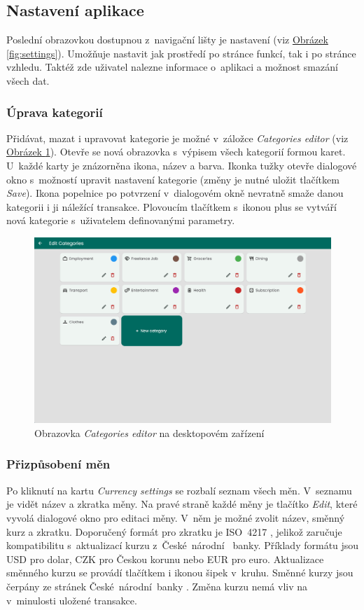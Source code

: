 \documentclass[
  biblatex,
  figures=true,
  tables=false,
  glossaries,
  index
]{kidiplom}
\begin{document}
\subsection{Nastavení aplikace}
Poslední obrazovkou dostupnou z~navigační lišty je nastavení (viz \hyperref[fig:settings]{Obrázek \ref{fig:settings}}). Umožňuje nastavit jak prostředí po stránce funkcí, tak i po stránce vzhledu. Taktéž zde uživatel nalezne informace o~aplikaci a možnost smazání všech dat.

\subsubsection{Úprava kategorií}
Přidávat, mazat i upravovat kategorie je možné v~záložce \textit{Categories editor} (viz \hyperref[fig:categories-editor]{Obrázek \ref{fig:categories-editor}}). Otevře se nová obrazovka s~výpisem všech kategorií formou karet. U~každé karty je znázorněna ikona, název a barva. Ikonka tužky otevře dialogové okno s~možností upravit nastavení kategorie (změny je nutné uložit tlačítkem \textit{Save}). Ikona popelnice po potvrzení v~dialogovém okně nevratně smaže danou kategorii i ji náležící transakce. Plovoucím tlačítkem s~ikonou plus se vytváří nová kategorie s~uživatelem definovanými parametry.

\begin{figure}
  \centering
  \includegraphics[width=\textwidth]{images/categories-editor-large.png}
  \caption{Obrazovka \textit{Categories editor} na desktopovém zařízení}
  \label{fig:categories-editor}
\end{figure}

\subsubsection{Přizpůsobení měn}
Po kliknutí na kartu \textit{Currency settings} se rozbalí seznam všech měn. V~seznamu je vidět název a zkratka měny. Na pravé straně každé měny je tlačítko \textit{Edit}, které vyvolá dialogové okno pro editaci měny. V~něm je možné zvolit název, směnný kurz a zkratku. Doporučený formát pro zkratku je  ISO~4217 \cite{iso4217}, jelikož zaručuje kompatibilitu s~aktualizací kurzu z~České~národní ~banky. Příklady formátu jsou USD pro dolar, CZK pro Českou korunu nebo EUR pro euro. Aktualizace směnného kurzu se provádí tlačítkem i ikonou šipek v~kruhu. Směnné kurzy jsou čerpány ze stránek České~národní~banky \cite{cnb-kurzy}. Změna kurzu nemá vliv na v~minulosti uložené transakce.
\end{document}
